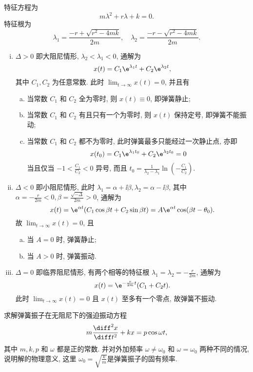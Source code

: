 \begin{solve}
  特征方程为
  \[m\lambda^2+r\lambda+k=0.\]
  特征根为
  \[\lambda_1=\frac{-r+\sqrt{r^2-4mk}}{2m},\quad\lambda_2=\frac{-r-\sqrt{r^2-4mk}}{2m}.\]
  \begin{enumerate}[(i)]
  \item $\Delta>0$ 即大阻尼情形, $\lambda_2<\lambda_1<0$, 通解为
  \[x(t)=C_1\e^{\lambda_1t}+C_2\e^{\lambda_2t},\]
  其中 $C_1,C_2$ 为任意常数. 此时 $\lim_{t\to\infty}x(t)=0$, 并且有
  \begin{enumerate}[(a)]
  \item 当常数 $C_1$ 和 $C_2$ 全为零时, 则 $x(t)\equiv 0$, 即弹簧静止;
  \item 当常数 $C_1$ 和 $C_2$ 有且只有一个为零时, 则 $x(t)$ 保持定号, 即弹簧不能振动;
  \item 当常数 $C_1$ 和 $C_2$ 都不为零时, 此时弹簧最多只能经过一次静止点, 亦即
  \[x(t_0)=C_1\e^{\lambda_1t_0}+C_2\e^{\lambda_2t_0}=0\]
  当且仅当 $-1<\frac{C_1}{C_2}<0$ 异号, 
  而且 $t_0=\frac{1}{\lambda_2-\lambda_1}\ln\left(-\frac{C_1}{C_2}\right)$.
  \end{enumerate}
  \item $\Delta<0$ 即小阻尼情形, 此时 $\lambda_1=\alpha+\ii\beta,\lambda_2=\alpha-\ii\beta$, 
  其中 $\alpha=-\frac{r}{2m}<0,\beta=\frac{\sqrt{-\Delta}}{2m}>0$, 通解为
  \[x(t)=\e^{\alpha t}(C_1\cos\beta t+C_2\sin\beta t)=A\e^{\alpha t}\cos(\beta t-\theta_0).\]
  故 $\lim_{t\to\infty}x(t)=0$, 且
  \begin{enumerate}[(a)]
  \item 当 $A=0$ 时, 弹簧静止;
  \item 当 $A>0$ 时, 弹簧振动.
  \end{enumerate}
  \item $\Delta=0$ 即临界阻尼情形, 有两个相等的特征根 $\lambda_1=\lambda_2=-\frac{r}{2m}$, 通解为
  \[x(t)=\e^{-\frac{r}{2m}t}(C_1+C_2t).\]
  此时 $\lim_{t\to\infty}x(t)=0$ 且 $x(t)$ 至多有一个零点, 故弹簧不振动.\qedhere
  \end{enumerate}
\end{solve}



\begin{exercise}
  求解弹簧振子在无阻尼下的强迫振动方程
  \[m\frac{\diff^2x}{\diff t^2}+kx=p\cos\omega t,\]
  其中 $m,k,p$ 和 $\omega$ 都是正的常数. 
  并对外加频率 $\omega\neq\omega_0$ 和 $\omega=\omega_0$ 两种不同的情况, 
  说明解的物理意义, 这里 $\omega_0=\sqrt{\frac{k}{m}}$是弹簧振子的固有频率.
\end{exercise}

